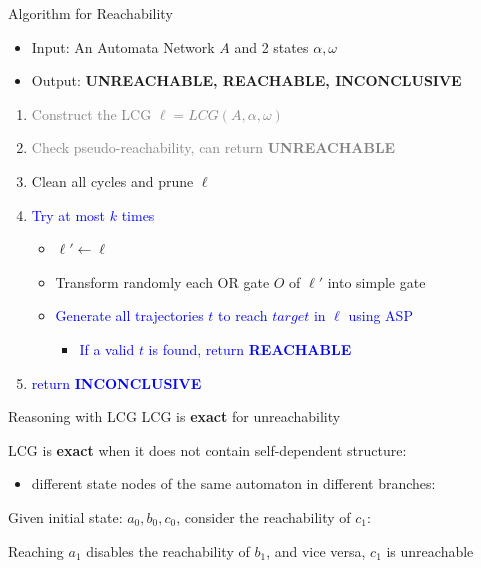 \documentclass[8pt]{beamer}
\begin{document}
\begin{frame}{Algorithm for Reachability}
    \begin{itemize}
    \item Input: An Automata Network $A$ and 2 states $\alpha, \omega$ 
    \item Output: \textbf{UNREACHABLE, REACHABLE, INCONCLUSIVE}
\end{itemize}
\begin{enumerate}
    \item \textcolor{gray}{Construct the LCG $\ell=LCG(A,\alpha,\omega)$}
    \item \textcolor{gray}{Check pseudo-reachability, can return \textbf{UNREACHABLE}}
    \item Clean all cycles and prune $\ell$
    \item \textcolor{blue}{Try at most $k$ times}
    \begin{itemize}
        \item {$\ell'\gets \ell$}
        \item { Transform randomly each OR gate $O$ of $\ell'$ into simple gate}
        \item \textcolor{blue}{ Generate all trajectories $t$ to reach $target$ in $\ell$ using ASP}
        \begin{itemize}
            \item\textcolor{blue}{If a valid $t$ is found, return \textbf{REACHABLE}}
        \end{itemize}
    \end{itemize}
    \item\textcolor{blue}{return \textbf{INCONCLUSIVE}}
\end{enumerate}
\end{frame}

%
%

\begin{frame}{Reasoning with LCG}
LCG is \textbf{exact} for unreachability 

LCG is \textbf{exact} when it does not contain self-dependent structure:
\begin{itemize}


\item different state nodes of the same automaton in different branches:
\end{itemize}
Given initial state: $a_0,b_0,c_0$, consider the reachability of $c_1$:
\begin{figure}
    
\end{figure}

Reaching $a_1$ disables the reachability of $b_1$, and vice versa, $c_1$ is unreachable
\end{frame}
\end{document}
